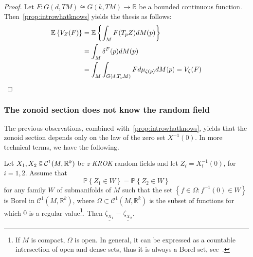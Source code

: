 \documentclass[10pt]{amsart}
\theoremstyle{definition}\newtheorem{defi}[theo]{Definition}\newtheorem{rema}[theo]{Remark}\newtheorem{exam}[theo]{Example}\newtheorem{exem}[theo]{Example}\newtheorem{nota}[theo]{Notation}
\newcommand{\R}{\mathbb{R}}
\newcommand{\PP}{\mathbb{P}}
\newcommand{\EE}{\mathbb{E}}
\newcommand{\mC}{\mathcal{C}}
\newcommand{\seg}{\underline}
\newcommand{\zkrok}{\emph{z-KROK}\xspace}
\newcommand*\randin{
\mathchoice {\raisebox{-.35ex}{$\displaystyle{^\subset}$}\mkern-11.5mu\raisebox{+.45ex}{$\displaystyle{_\subset}$}} {\mkern+1mu\raisebox{-.27ex}{$\textstyle{^\subset}$}\mkern-11.7mu\raisebox{+.45ex}{$\textstyle{_\subset}$}} {\raisebox{.35ex}{$\scriptstyle\subset$}\mkern-14mu\raisebox{-.15ex}{$\scriptstyle\subset$}} {\raisebox{.3ex}{$\scriptscriptstyle\subset$}\mkern-13.5mu\raisebox{-.10ex}{$\scriptscriptstyle\subset$}}}
\begin{document}
\begin{proof}
Let $F\colon G(d,TM)\cong G(k,TM)\to \R$ be a bounded continuous function. Then~\cref{prop:introwhatknows} yields the thesis as follows:
\begin{align*}
\EE\left\{ V_Z(F)\right\} &=\EE\left\{ \int_M F(T_pZ)dM(p)\right\}
\\
&= \int_M \delta^F(p) dM(p)
\\
&= \int_M \int_{G\left(d,T_pM\right)}Fd\mu_{\zeta(p)} dM(p)=V_{\zeta}(F)\qedhere
\end{align*}
\end{proof}


\subsubsection{The zonoid section does not know the random field}

The previous observations, combined with~\cref{prop:introwhatknows}, yields that the zonoid section depends only on the law of the zero set $X^{-1}(0)$. In more technical terms, we have the following.


\begin{prop}\label{prop:onlydeponrandsubm}
Let $X_1,X_2\,\randin\,\mC^1(M,\R^k)$ be \zkrok random fields and let $Z_i=X_i^{-1}(0)$, for $i=1,2.$ Assume that
\begin{equation}\label{eq:P1ZZA}
\PP\left\{ Z_1\in W\right\}=\PP\left\{ Z_2\in W\right\}
\end{equation}
for any family $W$ of submanifolds of $M$ such that the set $\left\{ f\in\Omega:f^{-1}(0)\in W\right\}$ is Borel in $\mC^1(M,\R^k)$, where $\Omega\subset \mC^1(M,\R^k)$ is the subset of functions for which $0$ is a regular value\footnote{If $M$ is compact, $\Omega$ is open. In general, it can be expressed as a countable intersection of open and dense sets, thus it is always a Borel set, see~\cite{Hirsch}.}. Then $\seg{\zeta_{X_1}}=\seg{\zeta_{X_2}}$.
\end{prop}
\end{document}
